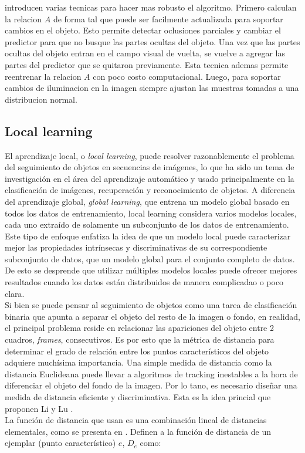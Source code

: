\documentclass[a4paper,10pt]{article}
\begin{document}
\citeauthor*{alp} introducen varias tecnicas para hacer mas robusto el algoritmo.
Primero calculan la relacion $A$ de forma tal que puede ser facilmente actualizada para soportar cambios en el objeto.
Esto permite detectar oclusiones parciales y cambiar el predictor para que no busque las partes ocultas del objeto.
Una vez que las partes ocultas del objeto entran en el campo visual de vuelta, se vuelve a agregar las partes del predictor que se quitaron previamente.
Esta tecnica ademas permite reentrenar la relacion $A$ con poco costo computacional.
Luego, para soportar cambios de iluminacion en la imagen siempre ajustan las muestras tomadas a una distribucion normal.

\subsection{Local learning}

El aprendizaje local, o \textit{local learning}, puede resolver razonablemente el problema del seguimiento de objetos en secuencias de imágenes, lo
que ha sido un tema de investigación en el área del aprendizaje automático \cite{local-learning-machine-learnin} y usado principalmente en la clasificación 
de imágenes, recuperación y reconocimiento de objetos. A diferencia del aprendizaje global, \textit{global learning}, que entrena un modelo global basado en 
todos los datos de entrenamiento, local learning considera varios modelos locales, cada uno extraído de solamente un subconjunto de los datos de entrenamiento.
Este tipo de enfoque enfatiza la idea de que un modelo local puede caracterizar mejor las propiedades intrínsecas y discriminativas de su correspondiente 
subconjunto de datos, que un modelo global para el conjunto completo de datos. De esto se desprende que utilizar múltiples modelos locales puede ofrecer 
mejores resultados cuando los datos están distribuidos de manera complicadao o poco clara.\\
Si bien se puede pensar al seguimiento de objetos como una tarea de clasificación binaria 
que apunta a separar el objeto del resto de la imagen o fondo, en realidad, el principal
problema reside en relacionar las apariciones del objeto entre 2 cuadros, \textit{frames},
consecutivos. Es por esto que la métrica de distancia para determinar el grado de 
relación entre los puntos característicos del objeto adquiere muchísima importancia.
Una simple medida de distancia como la distancia Euclideana puede llevar a algoritmos
de tracking inestables a la hora de diferenciar el objeto del fondo de la imagen. Por
lo tano, es necesario diseñar una medida de distancia eficiente y discriminativa. Esta 
es la idea princial que proponen Li y Lu \cite{local-learning}.\\
La función de distancia que usan es una combinación lineal de distancias elementales, 
como se presenta en \cite{malisiewicz-cvpr08}. Definen a la función de distancia de un 
ejemplar (punto característico) $e$, $D_{e}$ como:
\end{document}
